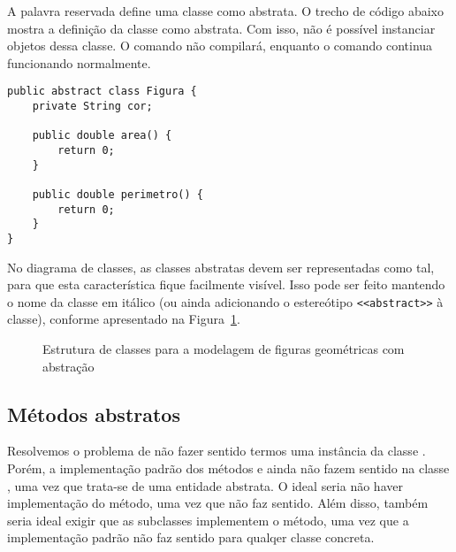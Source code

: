 A palavra reservada  define uma classe como abstrata. O trecho de código abaixo mostra a definição da classe  como abstrata. Com isso, não é possível instanciar objetos dessa classe. O comando  não compilará, enquanto o comando  continua funcionando normalmente.

\begin{verbatim}
public abstract class Figura {
	private String cor;

	public double area() {
		return 0;
	}
	
	public double perimetro() {
		return 0;
	}
}
\end{verbatim}

No diagrama de classes, as classes abstratas devem ser representadas como tal, para que esta característica fique facilmente visível. Isso pode ser feito mantendo o nome da classe em itálico (ou ainda adicionando o estereótipo \texttt{<<abstract>>} à classe), conforme apresentado na Figura~\ref{fig:abstratas-figuras-abstract}.

\begin{figure}[h]
	\centering
	
	
	\caption{Estrutura de classes para a modelagem de figuras geométricas com abstração}
	\label{fig:abstratas-figuras-abstract}
\end{figure}

\subsection{Métodos abstratos}

Resolvemos o problema de não fazer sentido termos uma instância da classe . Porém, a implementação padrão dos métodos  e  ainda não fazem sentido na classe , uma vez que trata-se de uma entidade abstrata. O ideal seria não haver implementação do método, uma vez que não faz sentido. Além disso, também seria ideal exigir que as subclasses implementem o método, uma vez que a implementação padrão não faz sentido para qualqer classe concreta.

